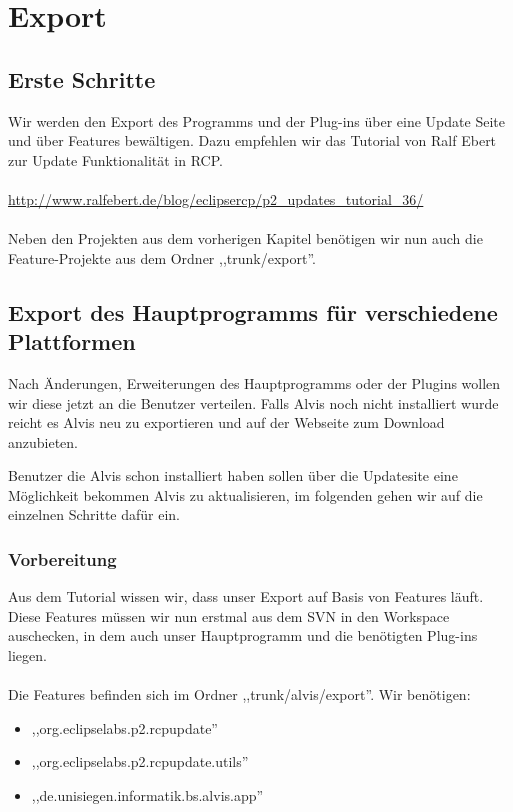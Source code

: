 \documentclass[10pt,a4paper,oneside]{scrbook}
\begin{document}
\newpage
\chapter{Export}
\section{Erste Schritte}
Wir werden den Export des Programms und der Plug-ins über eine Update Seite und über Features bewältigen. Dazu empfehlen wir das Tutorial von Ralf Ebert zur Update Funktionalität in RCP.
\\ \\
\url{http://www.ralfebert.de/blog/eclipsercp/p2\_updates\_tutorial\_36/}
\\ \\
Neben den Projekten aus dem vorherigen Kapitel benötigen wir nun auch die Feature-Projekte aus dem Ordner ,,trunk/export''.

\section{Export des Hauptprogramms für verschiedene Plattformen}
Nach Änderungen, Erweiterungen des Hauptprogramms oder der Plugins wollen wir diese jetzt an die Benutzer verteilen. Falls Alvis noch nicht installiert wurde reicht es Alvis neu zu exportieren und auf der Webseite zum Download anzubieten.

Benutzer die Alvis schon installiert haben sollen über die Updatesite eine Möglichkeit  bekommen Alvis zu aktualisieren, im folgenden gehen wir auf die einzelnen Schritte dafür ein.

\subsection{Vorbereitung}
Aus dem Tutorial wissen wir, dass unser Export auf Basis von Features läuft. Diese Features müssen wir nun erstmal aus dem SVN in den Workspace auschecken, in dem auch unser Hauptprogramm und die benötigten Plug-ins liegen.
\\ \\
Die Features befinden sich im Ordner ,,trunk/alvis/export''.
Wir benötigen:
\begin{itemize}
\item ,,org.eclipselabs.p2.rcpupdate''
\item ,,org.eclipselabs.p2.rcpupdate.utils''
\item ,,de.unisiegen.informatik.bs.alvis.app''
\end{itemize}
\end{document}
